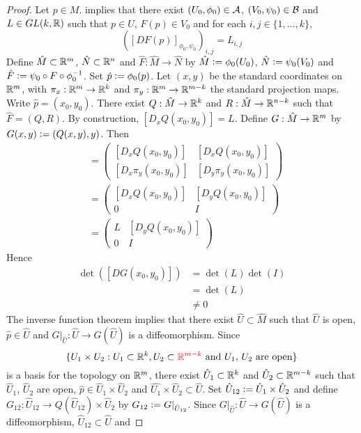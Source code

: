 \documentclass{book}
\begin{document}
	\begin{proof} Let $p \in M$.  implies that there exist $(U_0, \phi_0) \in \mathcal{A}$, $(V_0, \psi_0) \in \mathcal{B}$ and $L \in GL(k, \mathbb{R})$ such that $p \in U$, $F(p) \in V_0$ and for each $i,j \in \{1, \ldots, k\}$, 
		$$([DF(p)]_{\phi_0, \psi_0})_{i,j} = L_{i,j} $$ 
		Define $\hat{M} \subset \mathbb{R}^m$, $\hat{N} \subset \mathbb{R}^n$ and $\hat{F}: \hat{M} \rightarrow \hat{N}$ by $\hat{M} \vcentcolon= \phi_0(U_0)$, $\hat{N} \vcentcolon= \psi_0(V_0)$ and $\hat{F} \vcentcolon= \psi_0 \circ F \circ \phi_0^{-1}$. Set $\hat{p} \vcentcolon= \phi_0(p)$. Let $(x, y)$ be the standard coordinates on $\mathbb{R}^m$, with $\pi_x: \mathbb{R}^m \rightarrow \mathbb{R}^k$ and $\pi_y: \mathbb{R}^m \rightarrow \mathbb{R}^{m-k}$ the standard projection maps. Write $\hat{p} = (x_0, y_0)$. There exist $Q: \hat{M} \rightarrow \mathbb{R}^k$ and $R: \hat{M} \rightarrow  \mathbb{R}^{n-k}$ such that $\hat{F} = (Q, R)$. By construction, $[D_xQ(x_0, y_0)] = L$. Define $G: \hat{M} \rightarrow \mathbb{R}^m$ by $G(x, y) \vcentcolon= (Q(x, y), y)$. Then
		\begin{align*}
			[D G (x_0, y_0)] 
			& = \begin{pmatrix}
				[D_{x}Q(x_0, y_0)] & [D_{x}Q(x_0, y_0)] \\
				[D_{x} \pi_{y}(x_0, y_0)] &  	[D_{y} \pi_{y}(x_0, y_0) ]
			\end{pmatrix}  \\
			& = 
			\begin{pmatrix}
				[D_{x}Q(x_0, y_0)] & [D_{y}Q(x_0, y_0)] \\
				0 & I 
			\end{pmatrix} \\
			& = 
			\begin{pmatrix}
				L & [D_{y}Q(x_0, y_0)] \\
				0 & I 
			\end{pmatrix} 
		\end{align*}  
		Hence 
		\begin{align*}
			\det([D G (x_0, y_0)]) 
			& = \det(L) \det(I) \\
			& = \det(L) \\
			& \neq 0
		\end{align*}
		The inverse function theorem implies that there exist $\hat{U} \subset \hat{M}$ such that $\hat{U}$ is open, $\hat{p} \in \hat{U}$ and $G|_{\hat{U}}: \hat{U} \rightarrow G(\hat{U})$ is a diffeomorphism. Since 
		$$\{U_1 \times U_2: U_1 \subset \mathbb{R}^k, U_2 \subset \textcolor{red}{\mathbb{R}^{m-k} }\text{ and $U_1$, $U_2$ are open} \}$$ 
		is a basis for the topology on $\mathbb{R}^m$, there exist $\hat{U}_1 \subset \mathbb{R}^k$ and $\hat{U}_2 \subset \mathbb{R}^{m-k}$ such that $\hat{U}_1$, $\hat{U}_2$ are open, $\hat{p} \in \hat{U}_1 \times \hat{U}_2$ and $\hat{U_1} \times \hat{U}_2 \subset \hat{U}$. Set $\hat{U}_{12} \vcentcolon= \hat{U}_1 \times \hat{U}_2$ and define $G_{12} : \hat{U}_{12} \rightarrow Q(\hat{U}_{12}) \times \hat{U}_2$ by $G_{12} \vcentcolon= G|_{\hat{U}_{12}}$. Since $G|_{\hat{U}}: \hat{U} \rightarrow G(\hat{U})$ is a diffeomorphism, $\hat{U}_{12} \subset  \hat{U}$ and 

\end{proof}
\end{document}

